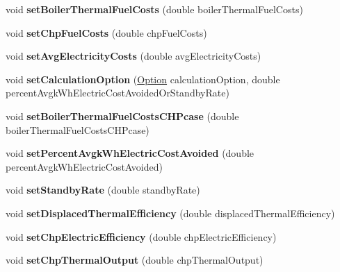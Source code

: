 \begin{DoxyCompactItemize}
void {\bfseries set\+Boiler\+Thermal\+Fuel\+Costs} (double boiler\+Thermal\+Fuel\+Costs)
\item 
\mbox{\label{class_c_h_p_a419c9eaf0ad6009bb3dd753e4b1dd63b}} 
void {\bfseries set\+Chp\+Fuel\+Costs} (double chp\+Fuel\+Costs)
\item 
\mbox{\label{class_c_h_p_ad953f7558bf3a38816e29d9ffaf6273c}} 
void {\bfseries set\+Avg\+Electricity\+Costs} (double avg\+Electricity\+Costs)
\item 
\mbox{\label{class_c_h_p_abfa71c23fa4b58c03c3337b57ba0d56d}} 
void {\bfseries set\+Calculation\+Option} (\hyperlink{class_c_h_p_ac82f530412021ace928a7e95c1295d06}{Option} calculation\+Option, double percent\+Avgk\+Wh\+Electric\+Cost\+Avoided\+Or\+Standby\+Rate)
\item 
\mbox{\label{class_c_h_p_a319f1e915035b2dface2dbad67c65017}} 
void {\bfseries set\+Boiler\+Thermal\+Fuel\+Costs\+C\+H\+Pcase} (double boiler\+Thermal\+Fuel\+Costs\+C\+H\+Pcase)
\item 
\mbox{\label{class_c_h_p_a002b9e405c3a1777b306430cd1bbbec3}} 
void {\bfseries set\+Percent\+Avgk\+Wh\+Electric\+Cost\+Avoided} (double percent\+Avgk\+Wh\+Electric\+Cost\+Avoided)
\item 
\mbox{\label{class_c_h_p_ac25d489d5d3e336f7286c0124f81d3c5}} 
void {\bfseries set\+Standby\+Rate} (double standby\+Rate)
\item 
\mbox{\label{class_c_h_p_a6f80ede27800dfdeb0493e0501823fde}} 
void {\bfseries set\+Displaced\+Thermal\+Efficiency} (double displaced\+Thermal\+Efficiency)
\item 
\mbox{\label{class_c_h_p_a63de982e8324e669ea8a6712a30a6ce4}} 
void {\bfseries set\+Chp\+Electric\+Efficiency} (double chp\+Electric\+Efficiency)
\item 
\mbox{\label{class_c_h_p_a4b132e4e600df80fa87c0e7b680733b7}} 
void {\bfseries set\+Chp\+Thermal\+Output} (double chp\+Thermal\+Output)
\item 
\mbox{\label{class_c_h_p_a0dc3c1f0e0b67564a56b5863c1abf974}} 

\end{DoxyCompactItemize}
